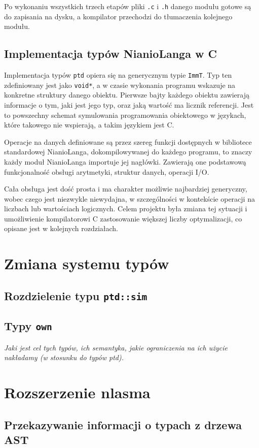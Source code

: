 \documentclass[licencjacka]{pracamgr}
\begin{document}
Po wykonaniu wszystkich trzech etapów pliki \texttt{.c} i \texttt{.h} danego modułu gotowe są do zapisania na dysku, a kompilator przechodzi do
tłumaczenia kolejnego modułu.
\section{Implementacja typów NianioLanga w C}
\label{sec:c_types_implementation}
Implementacja typów \texttt{ptd} opiera się na generycznym typie \texttt{ImmT}. Typ ten zdefiniowany jest jako \texttt{void*}, a w czasie wykonania
programu wskazuje na konkretne struktury danego obiektu. Pierwsze bajty każdego obiektu zawierają informacje o tym, jaki jest jego typ, oraz jaką
wartość ma licznik referencji. Jest to powszechny schemat symulowania programowania obiektowego w językach, które takowego nie wspierają, a takim
językiem jest C.


Operacje na danych definiowane są przez szereg funkcji dostępnych w bibliotece standardowej NianioLanga, dokompilowywanej do każdego programu, to
znaczy każdy moduł NianioLanga importuje jej nagłówki. Zawierają one podstawową funkcjonalność obsługi arytmetyki, struktur danych, operacji I/O.


Cała obsługa jest dość prosta i ma charakter możliwie najbardziej generyczny, wobec czego jest niezwykle niewydajna, w szczególności w kontekście
operacji na liczbach lub wartościach logicznych. Celem projektu była zmiana tej sytuacji i umożliwienie kompilatorowi C zastosowanie większej liczby
optymalizacji, co opisane jest w kolejnych rozdziałach.

\chapter{Zmiana systemu typów}
\section{Rozdzielenie typu \texttt{ptd::sim}}
\section{Typy \texttt{own}}
  \emph{Jaki jest cel tych typów, ich semantyka, jakie ograniczenia na ich użycie
    nakładamy (w stosunku do typów ptd).}


\chapter{Rozszerzenie nlasma}
\section{Przekazywanie informacji o typach z drzewa AST}
\end{document}
